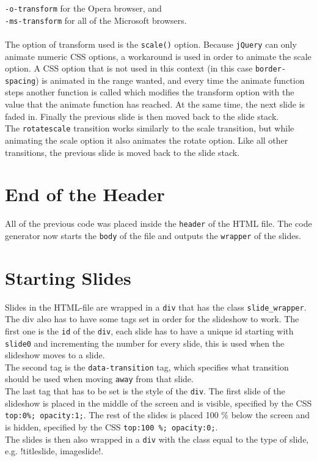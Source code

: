 \texttt{-o-transform} for the Opera browser, and \\
\texttt{-ms-transform} for all of the Microsoft browsers. \\ \\
The option of transform used is the \texttt{scale()} option. Because \texttt{jQuery} can only animate numeric CSS options, a workaround is used in order to animate the scale option. A CSS option that is not used in this context (in this case \texttt{border-spacing}) is animated in the range wanted, and every time the animate function steps another function is called which modifies the transform option with the value that the animate function has reached. At the same time, the next slide is faded in. Finally the previous slide is then moved back to the slide stack. \\
The \texttt{rotatescale} transition works similarly to the scale transition, but while animating the scale option it also animates the rotate option. Like all other transitions, the previous slide is moved back to the slide stack.

\section{End of the Header}
All of the previous code was placed inside the \texttt{header} of the HTML file. The code generator now starts the \texttt{body} of the file and outputs the \texttt{wrapper} of the slides.

\section{Starting Slides}
Slides in the HTML-file are wrapped in a \texttt{div} that has the class \texttt{slide\_wrapper}. The div also has to have some tags set in order for the slideshow to work. The first one is the \texttt{id} of the \texttt{div}, each slide has to have a unique id starting with \texttt{slide0} and incrementing the number for every slide, this is used when the slideshow moves to a slide. \\
The second tag is the \texttt{data-transition} tag, which specifies what transition should be used when moving \texttt{away} from that slide. \\
The last tag that has to be set is the style of the \texttt{div}. The first slide of the slideshow is placed in the middle of the screen and is visible, specified by the CSS \texttt{top:0\%; opacity:1;}. The rest of the slides is placed 100 \% below the screen and is hidden, specified by the CSS \texttt{top:100 \%; opacity:0;}. \\
The slides is then also wrapped in a \texttt{div} with the class equal to the type of slide, e.g. \lstline!titleslide, imageslide!.

